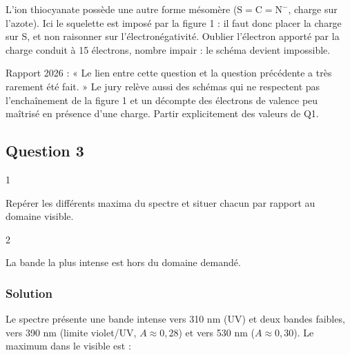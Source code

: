\documentclass[11pt,a4paper]{article}
\newcommand{\equationajustee}[1]{%
  \sbox{\boiteequation}{$\displaystyle #1$}%
  \ifdim\wd\boiteequation>\linewidth
    \[\resizebox{\linewidth}{!}{\usebox{\boiteequation}}\]%
  \else
    \[#1\]%
  \fi}
\begin{document}
\begin{piege}

L'ion thiocyanate possède une autre forme mésomère (\(\mathrm{S{=}C{=}N^-}\), charge sur l'azote). Ici le squelette est imposé par la figure 1 : il faut donc placer la charge sur S, et non raisonner sur l'électronégativité. Oublier l'électron apporté par la charge conduit à 15 électrons, nombre impair : le schéma devient impossible.

\end{piege}

\begin{jury}

Rapport 2026 : « Le lien entre cette question et la question précédente a très rarement été fait. » Le jury relève aussi des schémas qui ne respectent pas l'enchaînement de la figure 1 et un décompte des électrons de valence peu maîtrisé en présence d'une charge. Partir explicitement des valeurs de Q1.

\end{jury}

\hypertarget{question-3}{%
\subsection{Question 3}\label{question-3}}

\begin{indication}{1}

Repérer les différents maxima du spectre et situer chacun par rapport au domaine visible.

\end{indication}

\begin{indication}{2}

La bande la plus intense est hors du domaine demandé.

\end{indication}

\hypertarget{solution-2}{%
\subsubsection{Solution}\label{solution-2}}

Le spectre présente une bande intense vers 310 nm (UV) et deux bandes faibles, vers 390 nm (limite violet/UV, \(A \approx 0{,}28\)) et vers 530 nm (\(A \approx 0{,}30\)). Le maximum dans le visible est :

\equationajustee{\boxed{\lambda_{\max,\text{vis}} \approx 530\ \text{nm}}}
\end{document}
